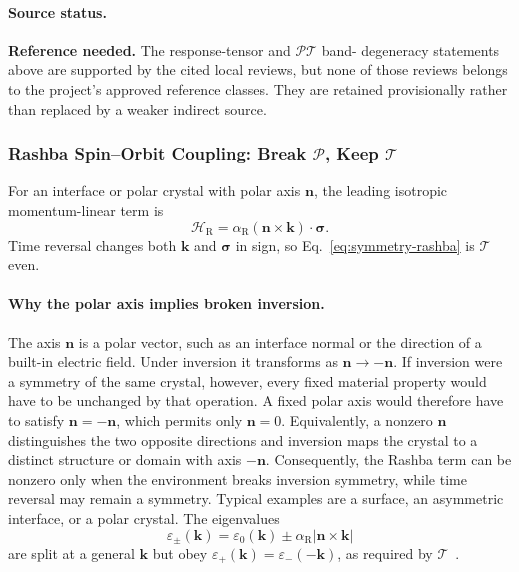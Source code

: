 \paragraph{Source status.}
\textbf{Reference needed.}  The response-tensor and $\mathcal{PT}$ band-
degeneracy statements above are supported by the cited local reviews, but none
of those reviews belongs to the project's approved reference classes.  They
are retained provisionally rather than replaced by a weaker indirect source.

\subsubsection{Rashba Spin--Orbit Coupling: Break $\mathcal{P}$, Keep
    $\mathcal{T}$}

For an interface or polar crystal with polar axis $\mathbf{n}$, the leading
isotropic momentum-linear term is
\begin{equation}
    \mathcal{H}_{\mathrm R}
    =\alpha_{\mathrm R}(\mathbf{n}\times\mathbf{k})\cdot
    \boldsymbol{\sigma}.
    \label{eq:symmetry-rashba}
\end{equation}
Time reversal changes both $\mathbf{k}$ and $\boldsymbol{\sigma}$ in sign, so
Eq.~\eqref{eq:symmetry-rashba} is $\mathcal{T}$ even.

\paragraph{Why the polar axis implies broken inversion.}
The axis $\mathbf{n}$ is a polar vector, such as an interface normal or the
direction of a built-in electric field.  Under inversion it transforms as
$\mathbf{n}\to-\mathbf{n}$.  If inversion were a symmetry of the same crystal,
however, every fixed material property would have to be unchanged by that
operation.  A fixed polar axis would therefore have to satisfy
$\mathbf{n}=-\mathbf{n}$, which permits only $\mathbf{n}=0$.  Equivalently, a
nonzero $\mathbf{n}$ distinguishes the two opposite directions and inversion
maps the crystal to a distinct structure or domain with axis $-\mathbf{n}$.
Consequently, the Rashba term can be nonzero only when the environment breaks
inversion symmetry, while time reversal may remain a symmetry.  Typical
examples are a surface, an asymmetric interface, or a polar crystal.  The
eigenvalues
\begin{equation}
    \varepsilon_{\pm}(\mathbf{k})
    =\varepsilon_0(\mathbf{k})
    \pm\alpha_{\mathrm R}\lvert\mathbf{n}\times\mathbf{k}\rvert
    \label{eq:rashba-splitting}
\end{equation}
are split at a general $\mathbf{k}$ but obey
$\varepsilon_{+}(\mathbf{k})=\varepsilon_{-}(-\mathbf{k})$, as required by
$\mathcal{T}$~\cite{manchon2015rashba}.


